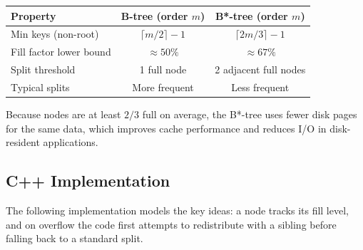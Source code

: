 \begin{center}
\begin{tabular}{lcc}
\toprule
Property & B-tree (order $m$) & B*-tree (order $m$) \\
\midrule
Min keys (non-root) & $\lceil m/2 \rceil - 1$ & $\lceil 2m/3 \rceil - 1$ \\
Fill factor lower bound & $\approx 50\%$ & $\approx 67\%$ \\
Split threshold & 1 full node & 2 adjacent full nodes \\
Typical splits & More frequent & Less frequent \\
\bottomrule
\end{tabular}
\end{center}

Because nodes are at least $2/3$ full on average, the B*-tree uses fewer disk pages for the same data, which improves cache performance and reduces I/O in disk-resident applications.

\subsection{C++ Implementation}

The following implementation models the key ideas: a node tracks its fill level, and on overflow the code first attempts to redistribute with a sibling before falling back to a standard split.


